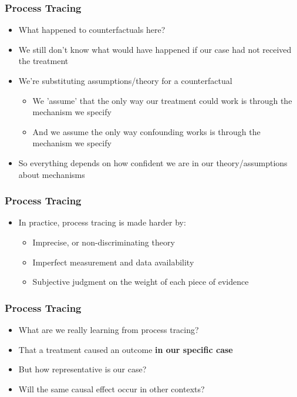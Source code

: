 \documentclass[xcolor=x11names,compress]{beamer}\usepackage[]{graphicx}\usepackage[]{color}
\renewcommand{\(}{\begin{columns}}
\renewcommand{\)}{\end{columns}}
\newcommand{\<}[1]{\begin{column}{#1}}
\renewcommand{\>}{\end{column}}
\begin{document}
\begin{frame}
\frametitle{Process Tracing}
\begin{itemize}
\item What happened to counterfactuals here?
\pause
\item We still don't know what would have happened if our case had not received the treatment
\pause
\item We're substituting assumptions/theory for a counterfactual
\pause
\begin{itemize}
\item We 'assume' that the only way our treatment could work is through the mechanism we specify
\pause
\item And we assume the only way confounding works is through the mechanism we specify
\end{itemize}
\item So everything depends on how confident we are in our theory/assumptions about mechanisms
\end{itemize}
\end{frame}

\begin{frame}
\frametitle{Process Tracing}
\begin{itemize}
\item In practice, process tracing is made harder by:
\pause
\begin{itemize}
\item Imprecise, or non-discriminating theory
\pause
\item Imperfect measurement and data availability
\pause
\item Subjective judgment on the weight of each piece of evidence
\end{itemize}
\end{itemize}
\end{frame}

\begin{frame}
\frametitle{Process Tracing}
\begin{itemize}
\item What are we really learning from process tracing?
\pause
\item That a treatment caused an outcome \textbf{in our specific case}
\pause
\item But how representative is our case?
\pause
\item Will the same causal effect occur in other contexts?
\end{itemize}
\end{frame}
\end{document}
